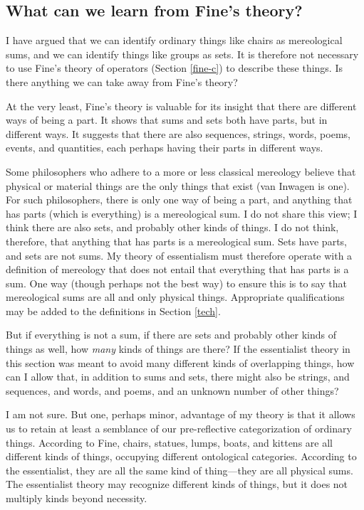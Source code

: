 \documentclass[12pt,twoside]{reedfancy}
\begin{document}
\begin{spacing}{1.25}
\subsection{What can we learn from Fine's theory?}
\label{need-fine}
I have argued that we can identify ordinary things like chairs as
mereological sums, and we can identify things like groups as sets.  It
is therefore not necessary to use Fine's theory of operators (Section
\ref{fine-c}) to describe these things.  Is there anything we can take
away from Fine's theory?

At the very least, Fine's theory is valuable for its insight that
there are different ways of being a part.  It shows that sums and sets
both have parts, but in different ways.  It suggests that there are
also sequences, strings, words, poems, events, and quantities, each
perhaps having their parts in different ways.

Some philosophers who adhere to a more or less classical mereology
believe that physical or material things are the only things that
exist (van Inwagen is one).  For such philosophers, there is only one
way of being a part, and anything that has parts (which is everything)
is a mereological sum.  I do not share this view; I think there are
also sets, and probably other kinds of things.  I do not think,
therefore, that anything that has parts is a mereological sum.  Sets
have parts, and sets are not sums.  My theory of essentialism must
therefore operate with a definition of mereology that does not entail
that everything that has parts is a sum.  One way (though perhaps not
the best way) to ensure this is to say that mereological sums are all
and only physical things.  Appropriate qualifications may be added to
the definitions in Section \ref{tech}.

But if everything is not a sum, if there are sets and probably other
kinds of things as well, how {\em many} kinds of things are there?  If
the essentialist theory in this section was meant to avoid many
different kinds of overlapping things, how can I allow that, in
addition to sums and sets, there might also be strings, and sequences,
and words, and poems, and an unknown number of other things?

I am not sure.  But one, perhaps minor, advantage of my theory is that
it allows us to retain at least a semblance of our pre-reflective
categorization of ordinary things.  According to Fine, chairs,
statues, lumps, boats, and kittens are all different kinds of things,
occupying different ontological categories.  According to the
essentialist, they are all the same kind of thing---they are all
physical sums.  The essentialist theory may recognize different kinds
of things, but it does not multiply kinds beyond necessity.


\end{spacing}
\end{document}
